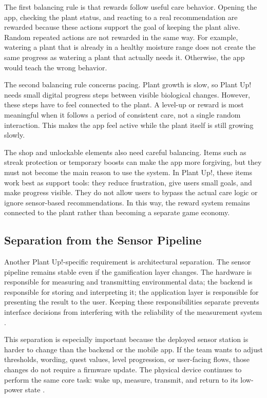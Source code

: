 The first balancing rule is that rewards follow useful care behavior.
 Opening the app, checking the plant status, and reacting to a real recommendation are rewarded because these actions support the goal of keeping the plant alive.
  Random repeated actions are not rewarded in the same way. For example, watering a plant that is already in a healthy moisture range does not create the same progress as watering a plant that actually needs it. Otherwise, the app would teach the wrong behavior.

The second balancing rule concerns pacing. 
Plant growth is slow, so Plant Up! needs small digital progress steps between visible biological changes.
 However, these steps have to feel connected to the plant. A level-up or reward is most meaningful when it follows a period of consistent care, not a single random interaction. 
 This makes the app feel active while the plant itself is still growing slowly.

The shop and unlockable elements also need careful balancing. Items such as streak protection or temporary boosts can make the app more forgiving, but they must not become the main reason to use the system. In Plant Up!, these items work best as support tools: they reduce frustration, give users small goals, and make progress visible. They do not allow users to bypass the actual care logic or ignore sensor-based recommendations. In this way, the reward system remains connected to the plant rather than becoming a separate game economy.

\subsection{Separation from the Sensor Pipeline}

Another Plant Up!-specific requirement is architectural separation. The sensor pipeline remains stable even if the gamification layer changes. The hardware is responsible for measuring and transmitting environmental data; the backend is responsible for storing and interpreting it; the application layer is responsible for presenting the result to the user. Keeping these responsibilities separate prevents interface decisions from interfering with the reliability of the measurement system \cite{fowlerMicroservices,oasisMQTT}.

This separation is especially important because the deployed sensor station is harder to change than the backend or the mobile app. 
If the team wants to adjust thresholds, wording, quest values, level progression, or user-facing flows, those changes do not require a firmware update. The physical device continues to perform the same core task: wake up, measure, transmit, and return to its low-power state \cite{espIdfDeepSleep,plantUpProject}.

